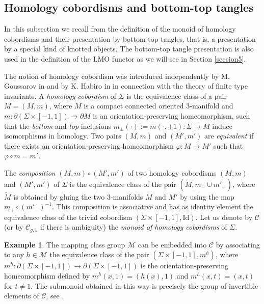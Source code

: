 \documentclass[10pt]{amsart}
\numberwithin{equation}{section}
\numberwithin{equation}{section}
\theoremstyle{definition}
\newtheorem{example}[theorem]{Example}
\begin{document}
\subsection{Homology cobordisms and bottom-top tangles}\label{subsection2.2}

In this subsection we recall from  \cite{MR2403806}   the definition of the monoid of homology cobordisms and their presentation by bottom-top tangles, that is, a presentation  by a special kind of  knotted objects. The bottom-top tangle presentation is also used in the definition of the LMO functor as we will see in Section \ref{seccion5}. 

The notion of homology cobordism was introduced independently by M.  Goussarov in \cite{MR1715131} and by K. Habiro in \cite{MR1735632} in connection with the theory of finite type invariants. A \emph{homology cobordism} of $\Sigma$ is the equivalence class of a pair $M=(M,m)$, where $M$ is a compact connected oriented 3-manifold and $m:\partial(\Sigma\times[-1,1])\rightarrow\partial M$ is an orientation-preserving homeomorphism, such that the \emph{bottom} and \emph{top} inclusions
$m_{\pm}(\cdot):=m(\cdot,\pm1):\Sigma\rightarrow M$ induce isomorphisms in homology. Two pairs $(M,m)$ and $(M',m')$ are \emph{equivalent} if there exists an orientation-preserving homeomorphism $\varphi:M\rightarrow M'$ such that $\varphi\circ m=m'$.

The \emph{composition} $(M,m)\circ (M',m')$ of two homology cobordisms $(M,m)$ and $(M',m')$ of $\Sigma$ is the equivalence class of the pair $(\widetilde{M},m_-\cup m'_+)$, where $\widetilde{M}$ is obtained by gluing the two 3-manifolds $M$ and $M'$ by using the map $m_+\circ(m'_-)^{-1}$. This composition is associative and has as identity element the equivalence class of the trivial cobordism $( \Sigma\times[-1,1], \text{Id})$.  Let us denote by $\mathcal{C}$ (or by $\mathcal{C}_{g,1}$ if there is ambiguity) the \emph{monoid of homology cobordisms} of $\Sigma$. 

\begin{example}\label{ejemplo1} The mapping class group $\mathcal{M}$ can be embedded into $\mathcal{C}$ by associating to any $h\in\mathcal{M}$ the equivalence class of the pair $(\Sigma\times[-1,1], m^h)$, where $m^h:\partial(\Sigma\times[-1,1])\rightarrow\partial (\Sigma\times[-1,1])$ is the orientation-preserving homeomorphism defined by $m^h(x,1)=(h(x),1)$ and  $m^h(x,t)=(x,t)$ for $t\not=1$. The submonoid obtained in this way is precisely the group of  invertible elements of $\mathcal{C}$, see \cite[Proposition 2.4]{MR2952770}. 
\end{example}
\end{document}
